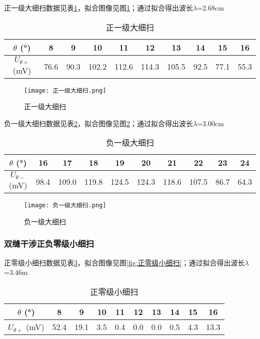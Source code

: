 \documentclass[11pt]{article}
\begin{document}
	正一级大细扫数据见表\ref{tab:正一级大细扫}，拟合图像见图\ref{fig:正一级大细扫}；通过拟合得出波长$\lambda$=2.68cm
	\begin{table}[h!]
		\centering
		\begin{tabular}{|c|c|c|c|c|c|c|c|c|c|}
			\hline
			$\theta$ (°) & 8 & 9 & 10 & 11 & 12 & 13 & 14 & 15 & 16 \\ \hline
			$U_{\theta+}$ (mV) & 76.6 & 90.3 & 102.2 & 112.6 & 114.3 & 105.5 & 92.5 & 77.1 & 55.3 \\ \hline
		\end{tabular}
		\caption{正一级大细扫}
		\label{tab:正一级大细扫}
	\end{table}
	
	\begin{figure}[h!]
		\centering
		\texttt{[image: 正一级大细扫.png]}
		\caption{正一级大细扫}
		\label{fig:正一级大细扫}
	\end{figure}
	
	负一级大细扫数据见表\ref{tab:负一级大细扫}，拟合图像见图\ref{fig:负一级大细扫}；通过拟合得出波长$\lambda$=3.00cm
	
	\begin{table}[h!]
		\centering
		\begin{tabular}{|c|c|c|c|c|c|c|c|c|c|}
			\hline
			$\theta$ (°) & 16 & 17 & 18 & 19 & 20 & 21 & 22 & 23 & 24 \\ \hline
			$U_{\theta-}$ (mV) & 98.4 & 109.0 & 119.8 & 124.5 & 124.3 & 118.6 & 107.5 & 86.7 & 64.3 \\ \hline
		\end{tabular}
		\caption{负一级大细扫}
		\label{tab:负一级大细扫}
	\end{table}
	
	\begin{figure}[h!]
		\centering
		\texttt{[image: 负一级大细扫.png]}
		\caption{负一级大细扫}
		\label{fig:负一级大细扫}
	\end{figure}
	
	
	\subsubsection{双缝干涉正负零级小细扫}
	
	正零级小细扫数据见表\ref{tab:正零级小细扫}，拟合图像见图\ref{fig:正零级小细扫}；通过拟合得出波长$\lambda$=3.46m
	\begin{table}[h!]
		\centering
		\begin{tabular}{|c|c|c|c|c|c|c|c|c|c|}
			\hline
			$\theta$ (°) & 8 & 9 & 10 & 11 & 12 & 13 & 14 & 15 & 16 \\ \hline
			$U_{\theta+}$ (mV) & 52.4 & 19.1 & 3.5 & 0.4 & 0.0 & 0.0 & 0.5 & 4.3 & 13.3 \\ \hline
		\end{tabular}
		\caption{正零级小细扫}
		\label{tab:正零级小细扫}
	\end{table}
	
\end{document}
